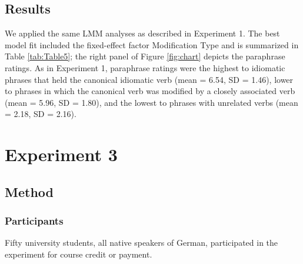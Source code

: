 \documentclass[output=paper]{langsci/langscibook}
\begin{document}
\begin{table}
\caption{Fixed effects of the predictors in the linear mixed-effect model for the paraphrase ratings in Experiment 2. \textit{Note.} significance code: *** < 0.0001.\label{tab:Table5}}
\end{table}


\subsection{Results}
We applied the same LMM analyses as described in Experiment 1. The best model fit included the fixed-effect factor Modification Type and is summarized in Table \ref{tab:Table5}; the right panel of Figure \ref{fig:chart} depicts the paraphrase ratings. As in Experiment 1, paraphrase ratings were the highest to idiomatic phrases that held the canonical idiomatic verb (mean = 6.54, SD = 1.46), lower to phrases in which the canonical verb was modified by a closely associated verb (mean = 5.96, SD = 1.80), and the lowest to phrases with unrelated verbs (mean = 2.18, SD = 2.16). 

\section{Experiment 3}
\subsection{Method}
\subsubsection{Participants}

Fifty university students, all native speakers of German, participated in the experiment for course credit or payment.
\end{document}
